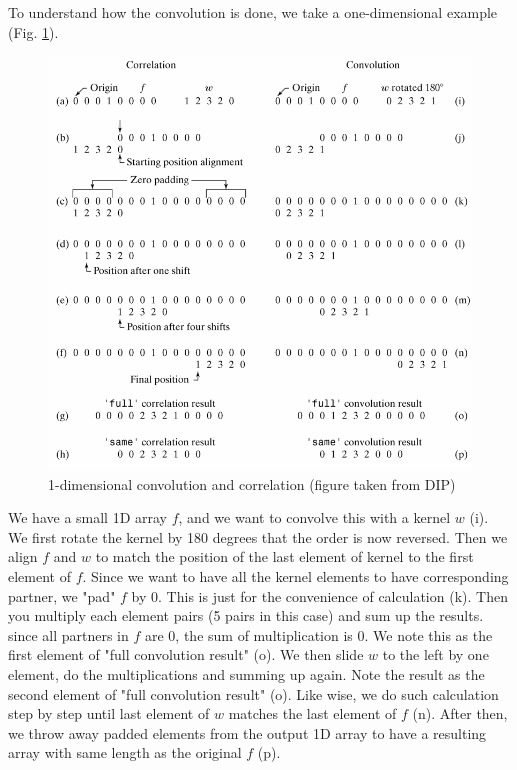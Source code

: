 To understand how the convolution is done, we take a one-dimensional
example (Fig. \ref{fig:img39}).


\begin{figure}[htbp]
\begin{center}
\includegraphics[width=11.718cm]{img/CMCIBasicCourse201102-img39.png}
\caption{ 1-dimensional convolution and correlation (figure taken from DIP)}
\label{fig:img39}
\end{center}
\end{figure}

We have a small 1D array $f$, and we want to convolve this with a
kernel $w$ (i). We first rotate the kernel by 180 degrees that
the order is now reversed. Then we align $f$ and $w$ to
match the position of the last element of kernel to the first element
of $f$. Since we want to have all the kernel elements to have
corresponding partner, we "pad" $f$ by 0.
This is just for the convenience of calculation (k). Then you multiply
each element pairs (5 pairs in this case) and sum up the results. since
all partners in $f$ are 0, the sum of multiplication is 0. We note this
as the first element of "full convolution
result" (o). We then slide $w$ to the left by one
element, do the multiplications and summing up again. Note the result
as the second element of "full convolution
result" (o). Like wise, we do such calculation step by
step until last element of $w$ matches the last element of
$f$ (n). After then, we throw away padded elements from the
output 1D array to have a resulting array with same length as the
original $f$ (p). 

